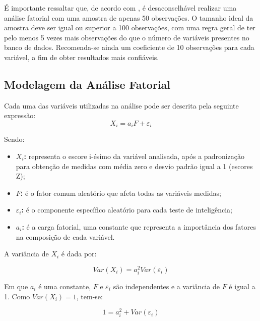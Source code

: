 É importante ressaltar que, de acordo com , é desaconselhável realizar uma análise fatorial com uma amostra de apenas 50 observações. O tamanho ideal da amostra deve ser igual ou superior a 100 observações, com uma regra geral de ter pelo menos 5 vezes mais observações do que o número de variáveis presentes no banco de dados. Recomenda-se ainda um coeficiente de 10 observações para cada variável, a fim de obter resultados mais confiáveis.

\subsection{Modelagem da Análise Fatorial}

Cada uma das variáveis utilizadas na análise pode ser descrita pela seguinte expressão:
\begin{equation}
X_i = a_iF + \varepsilon_i \label{eq:1}
\end{equation}

Sendo:

\begin{itemize}
    \item \textbf{$X_i$:} representa o escore i-ésimo da variável analisada, após a padronização para obtenção de medidas com média zero e desvio padrão igual a 1 (escores Z);
    \item \textbf{$F$:} é o fator comum aleatório que afeta todas as variáveis medidas;
    \item \textbf{$\varepsilon_i$:} é o componente específico aleatório para cada teste de inteligência;
    \item \textbf{$a_i$:} é a carga fatorial, uma constante que representa a importância dos fatores na composição de cada variável.
\end{itemize}

A variância de $X_i$ é dada por:

\begin{equation}
Var(X_i) = a_i^2 Var(\varepsilon_i)
\label{eq:2}
\end{equation}

Em que $a_i$ é uma constante, $F$ e $\varepsilon_i$ são independentes e a variância de $F$ é igual a 1. Como $Var(X_i) = 1$, tem-se:

\begin{equation}
1 = a_i^2 + Var(\varepsilon_i)
\label{eq:3}
\end{equation}

